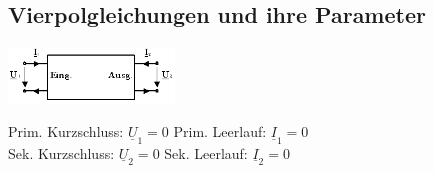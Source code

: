 \begin{table}
\subsection{Vierpolgleichungen und ihre Parameter}
	\begin{minipage}{5cm}
    	\includegraphics[height=1.5cm]{./bilder/vierpol}
    \end{minipage}
	\begin{minipage}{9cm}
    	Prim. Kurzschluss: $\underline{U}_1=0$ \qquad 
    	Prim. Leerlauf: $\underline{I}_1=0$\\ 
    	Sek. Kurzschluss: $\underline{U}_2=0$ \qquad 
    	Sek. Leerlauf: $\underline{I}_2=0$
    \end{minipage}
		

\end{table}
